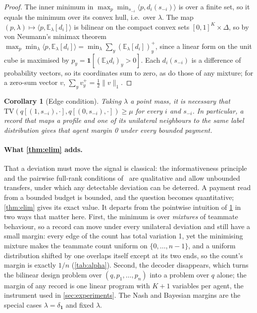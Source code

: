 \documentclass[sigconf,anonymous,acmthm=false]{aamas}
\theoremstyle{acmplain}
\newtheorem{corollary}{Corollary}
\theoremstyle{acmdefinition}
\newcommand{\E}{\mathbb{E}}
\newcommand{\TV}{\mathrm{TV}}
\begin{document}
\begin{proof}
The inner minimum in $\max_p\min_{s_{-i}}\langle p,d_i(s_{-i})\rangle$ is over a finite set,
so it equals the minimum over its convex hull, i.e.\ over $\lambda$. The map
$(p,\lambda)\mapsto\langle p,\E_\lambda[d_i]\rangle$ is bilinear on the compact convex sets
$[0,1]^K\times\Delta$, so by von Neumann's minimax theorem
$\max_p\min_\lambda\langle p,\E_\lambda[d_i]\rangle=\min_\lambda\sum_y(\E_\lambda[d_i])_y^+$,
since a linear form on the unit cube is maximised by $p_y=\mathbf1[(\E_\lambda d_i)_y>0]$.
Each $d_i(s_{-i})$ is a difference of probability vectors, so its coordinates sum to zero,
as do those of any mixture; for a zero-sum vector $v$, $\sum_yv_y^+=\frac12\|v\|_1$.
\end{proof}

\begin{corollary}[Edge condition]\label{cor:edge}
Taking $\lambda$ a point mass, it is necessary that
$\TV(q[(1,s_{-i}),\cdot],q[(0,s_{-i}),\cdot])\ge\mu$ for every $i$ and $s_{-i}$. In
particular, a record that maps a profile and one of its unilateral neighbours to the same
label distribution gives that agent margin 0 under every bounded payment.
\end{corollary}

\paragraph{What \cref{thm:elim} adds.} That a deviation must move the signal is classical:
the informativeness principle~\cite{holmstrom1979moral} and the pairwise full-rank
conditions of~\cite{fudenberg1994folk} are qualitative and allow unbounded transfers, under
which any detectable deviation can be deterred. A payment read from a bounded budget is
bounded, and the question becomes quantitative; \cref{thm:elim} gives its exact value. It
departs from the pointwise intuition of \cref{cor:edge} in two ways that matter here. First,
the minimum is over \emph{mixtures} of teammate behaviour, so a record can move under every
unilateral deviation and still have a small margin: every edge of the count has total
variation 1, yet the minimising mixture makes the teammate count uniform on
$\{0,\dots,n-1\}$, and a uniform distribution shifted by one overlaps itself except at its
two ends, so the count's margin is exactly $1/n$ (\cref{tab:alpha}). Second, the decoder
disappears, which turns the bilinear design problem over $(q,p_1,\dots,p_n)$ into a problem
over $q$ alone; the margin of any record is one linear program with $K+1$ variables per
agent, the instrument used in \cref{sec:experiments}. The Nash and Bayesian margins are the
special cases $\lambda=\delta_{\mathbf1}$ and fixed $\lambda$.
\end{document}
